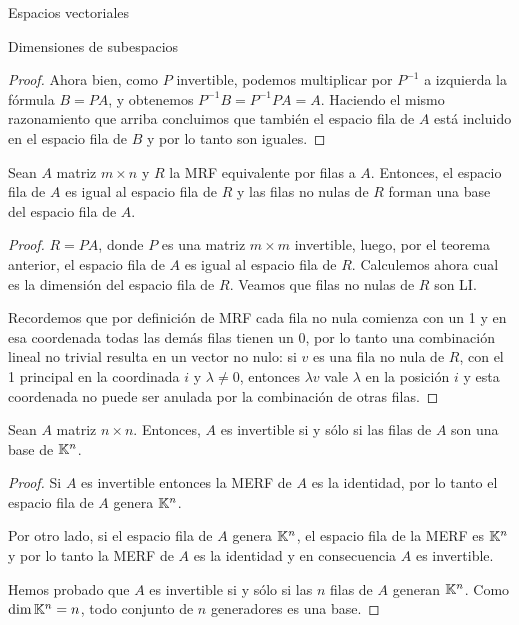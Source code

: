\begin{chapter}{Espacios vectoriales}
\begin{section}{Dimensiones de subespacios}
\begin{proof}
        Ahora bien, como $P$ invertible, podemos multiplicar por $P^{-1}$ a izquierda la fórmula $B= PA$, y obtenemos $P^{-1}B = P^{-1}P A = A$. Haciendo el mismo razonamiento que arriba concluimos que  también el espacio fila de $A$ está incluido en el espacio fila de $B$ y por lo tanto son iguales. 
        \end{proof}
    
    \begin{corolario}\label{subesp-merf}
            Sean $A$ matriz $m \times n$ y $R$ la MRF equivalente por filas a $A$. Entonces, el espacio fila de $A$ es igual al espacio fila de $R$ y las filas no nulas de $R$ forman una base del espacio fila de $A$. 
    \end{corolario}
    \begin{proof}
        $R=PA$, donde $P$ es una matriz $m \times m$ invertible, luego, por el teorema anterior, el espacio fila de $A$  es igual al espacio fila de $R$. Calculemos ahora cual es la dimensión del espacio fila de $R$. Veamos que filas no nulas de $R$ son LI. 
        
        Recordemos  que por definición de MRF cada fila no nula comienza con un 1 y en esa coordenada  todas las demás filas tienen un 0, por lo tanto una combinación lineal no trivial resulta en un vector no nulo: si $v$ es una fila no nula de $R$, con el 1 principal en la coordinada $i$ y $\lambda \ne0$,  entonces $\lambda v$ vale $\lambda$ en la posición $i$ y esta coordenada no puede ser anulada por la combinación de otras filas.  
    \end{proof}

    \begin{corolario}\label{inv-impl-filasgen}
            Sean $A$ matriz $n \times n$. Entonces, $A$ es invertible si y sólo si las filas de $A$ son una base de $\mathbb K^n$.
    \end{corolario}
    \begin{proof}
        Si $A$ es invertible entonces la MERF de $A$ es la identidad, por lo tanto  el espacio fila de $A$ genera $\mathbb K^n$.
        
        Por otro lado, si el espacio fila de $A$  genera $\mathbb K^n$, el espacio fila de  la  MERF es $\mathbb K^n$ y por lo tanto  la MERF de $A$ es la identidad y en consecuencia $A$ es invertible.
        
        Hemos probado que $A$ es invertible si y sólo si las $n$ filas de $A$ generan $\mathbb K^n$. Como $\dim \mathbb K^n = n$,  todo conjunto de $n$ generadores es una base. 
    \end{proof}
    

\end{section}
\end{chapter}
